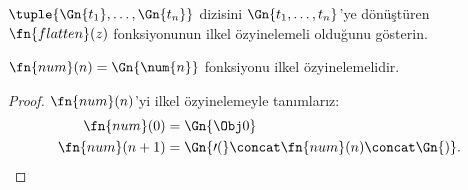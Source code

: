 \begin{prob}
$\tuple{\Gn{t_1},\dots,\Gn{t_n}}$ dizisini $\Gn{t_1,\dots,t_n}$'ye
dönüştüren $\fn{flatten}(z)$ fonksiyonunun ilkel özyinelemeli olduğunu
gösterin.
\end{prob}

\begin{prop}
  $\fn{num}(n)=\Gn{\num{n}}$ fonksiyonu ilkel özyinelemelidir.
\end{prop}

\begin{proof}
  $\fn{num}(n)$'yi ilkel özyinelemeyle tanımlarız:
  \begin{align*}
    \fn{num}(0) & = \Gn{\Obj 0}\\
    \fn{num}(n+1) & = \Gn{\prime(} \concat \fn{num}(n) \concat \Gn{)}.
  \end{align*}
\end{proof}

